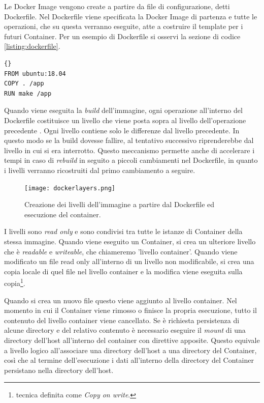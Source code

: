 Le Docker Image vengono create a partire da file di configurazione, detti Dockerfile. Nel Dockerfile viene specificata la Docker Image di partenza e tutte le operazioni, che su questa verranno eseguite, atte a costruire il template per i futuri Container. Per un esempio di Dockerfile si osservi la sezione di codice \ref{listing:dockerfile}.
\begin{lstlisting}[float={h},xleftmargin=0.2\textwidth, xrightmargin=0.2\textwidth,caption={Esempio di Dockerfile.},label={listing:dockerfile},captionpos=b,frame=single]{}
FROM ubuntu:18.04
COPY . /app
RUN make /app
\end{lstlisting}
Quando viene eseguita la \textit{build} dell'immagine, ogni operazione all'interno del Dockerfile costituisce un livello che viene posta sopra al livello dell'operazione precedente . Ogni livello contiene solo le differenze dal livello precedente. In questo modo se la build dovesse fallire, al tentativo successivo riprenderebbe dal livello in cui si era interrotto. Questo meccanismo permette anche di accelerare i tempi in caso di \textit{rebuild} in seguito a piccoli cambiamenti nel Dockerfile, in quanto i livelli verranno ricostruiti dal primo cambiamento a seguire.
\begin{figure}[hbtp]
    \centering
    \texttt{[image: dockerlayers.png]}
    \caption{Creazione dei livelli dell'immagine a partire dal Dockerfile ed esecuzione del container.}
    \label{fig:dockerlayers}
\end{figure}
I livelli sono \textit{read only} e sono condivisi tra tutte le istanze di Container della stessa immagine. Quando viene eseguito un Container, si crea un ulteriore livello che è \textit{readable} e \textit{writeable}, che chiameremo 'livello container'. Quando viene modificato un file read only all'interno di un  livello non modificabile, si crea una copia locale di quel file nel livello container e la modifica viene eseguita sulla  copia\footnote{tecnica definita come \textit{Copy on write}.}.

Quando si crea un nuovo file questo viene aggiunto  al livello container. Nel momento in cui il Container viene rimosso o finisce la propria esecuzione, tutto il contenuto del livello container viene cancellato. Se è richiesta  persistenza di alcune directory  e del relativo contenuto è necessario eseguire il \textit{mount} di una directory dell'host all'interno del container con direttive apposite.  Questo equivale a livello logico all'associare una directory dell'host a una directory del Container, così che al termine dell'esecuzione i dati all'interno della directory del Container persistano nella directory dell'host.

